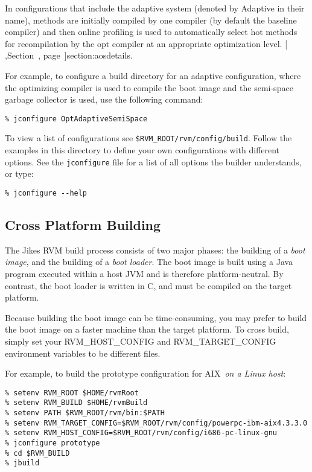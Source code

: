 %
In configurations that include the adaptive system (denoted by
Adaptive in their name), methods are initially compiled by one
compiler (by default the baseline compiler) and then online profiling
is used to automatically select hot methods for recompilation by the
opt compiler at an appropriate optimization level.  [ ,Section~\Ref, page~\Pageref]{section:aosdetails}.

For example, to configure a build directory for an adaptive
configuration, where the optimizing compiler is used to compile the
boot image and the semi-space garbage collector is used, use the
following command:

\begin{verbatim}
% jconfigure OptAdaptiveSemiSpace
\end{verbatim}

To view a list of configurations see 
\texttt{\$RVM\_ROOT/rvm/config/build}.  Follow the examples in this
directory to define your own configurations with different options.  See
the \texttt{jconfigure} file for a list of all options the builder
understands, or type:

\begin{verbatim}
% jconfigure --help
\end{verbatim}

\subsection{Cross Platform Building}\label{cross-platform-building}

The Jikes\TMweb{} RVM build process consists of two major phases:
the building of a 
{\em boot image}, and the building of a {\em boot loader}.
The boot image is built using a Java\TMweb{} program executed within a host
JVM and is therefore platform-neutral.  By contrast, the boot loader
is written in C, and must be compiled on the target platform.

Because building the boot image can be time-consuming,
you may prefer to build the boot image
on a faster machine than the target platform.  To cross build, simply
set your 
RVM\_HOST\_CONFIG and RVM\_TARGET\_CONFIG environment variables to
be different files.

For example, to build the prototype configuration for AIX\TMweb\ 
{\em on a Linux host}:
\begin{verbatim}
% setenv RVM_ROOT $HOME/rvmRoot
% setenv RVM_BUILD $HOME/rvmBuild
% setenv PATH $RVM_ROOT/rvm/bin:$PATH
% setenv RVM_TARGET_CONFIG=$RVM_ROOT/rvm/config/powerpc-ibm-aix4.3.3.0
% setenv RVM_HOST_CONFIG=$RVM_ROOT/rvm/config/i686-pc-linux-gnu
% jconfigure prototype
% cd $RVM_BUILD
% jbuild
\end{verbatim}

